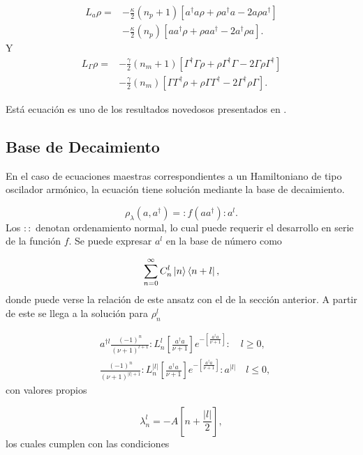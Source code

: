 \documentclass[10pt,a4paper]{report}
\begin{document}
\begin{align}
L_a \rho =& - \frac{\kappa}{2}(n_p + 1)[a^\dagger a\rho + \rho a^\dagger a -2a\rho a^\dagger]  \\
 &- \frac{\kappa}{2}(n_p)[ aa^\dagger\rho + \rho  aa^\dagger -2a^\dagger\rho a].\nonumber
\end{align}
 Y 
\begin{align}
L_\Gamma \rho =& - \frac{\gamma}{2}(n_m + 1)[\Gamma^\dagger \Gamma\rho + \rho \Gamma^\dagger \Gamma -2\Gamma\rho \Gamma^\dagger]  \\
 &- \frac{\gamma}{2}(n_m)[ \Gamma\Gamma^\dagger\rho + \rho  \Gamma\Gamma^\dagger -2\Gamma^\dagger\rho \Gamma].\nonumber
\end{align} 

Está ecuación es uno de los resultados novedosos presentados en \cite{YanesOC}.

\subsection{Base de Decaimiento}

En el caso de ecuaciones maestras correspondientes a un Hamiltoniano de tipo oscilador armónico, la ecuación tiene solución mediante la base de decaimiento\cite{EnglertDB}.

\begin{equation}\label{Englert1993}
\rho_\lambda (a,a^\dagger) = :f(aa^\dagger):a^l.
\end{equation} Los $::$ denotan ordenamiento normal, lo cual puede requerir el desarrollo en serie de la función $f$. Se puede expresar $a^l$ en la base de número como

\begin{equation}
\sum_{n=0}^\infty C_n^l\Ket{n}\Bra{n+l},
\end{equation} donde puede verse la relación de este ansatz con el de la sección anterior. A partir de este se llega a la solución para $\rho_n^l$ \cite{EnglertDB}

\begin{align}\label{DefDB}
&a^{\dagger l}\frac{(-1)^n}{(\nu+1)^{l+1}}:L_n^l[\frac{a^\dagger a}{\nu+1}]e^{-[\frac{a^\dagger a}{\nu+1}]}:\quad l \geq 0, \\
&\frac{(-1)^n}{(\nu+1)^{|l|+1}}:L_n^{|l|}[\frac{a^\dagger a}{\nu+1}]e^{-[\frac{a^\dagger a}{\nu+1}]}:a^{|l|}\quad l \leq 0,
\end{align} con valores propios

\begin{equation}
\lambda_n^l = -A[n + \frac{|l|}{2}],
\end{equation} los cuales cumplen con las condiciones
\end{document}
